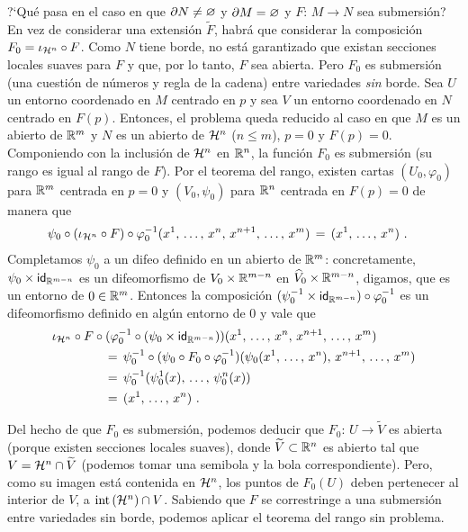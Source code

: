 \begin{obsInmersionConBorde}
	?`Qu\'{e} pasa en el caso en que $\borde[N]\not=\varnothing$ y
	$\borde[M]=\varnothing$ y $F:\,M\rightarrow N$ sea submersi\'{o}n?
	En vez de considerar una extensi\'{o}n $\widetilde{F}$, habr\'{a}
	que considerar la composici\'{o}n $F_{0}=\inc[{\hemi[n]}]\circ F$.
	Como $N$ tiene borde, no est\'{a} garantizado que existan secciones
	locales suaves para $F$ y que, por lo tanto, $F$ sea abierta. Pero
	$F_{0}$ es submersi\'{o}n (una cuesti\'{o}n de n\'{u}meros y regla
	de la cadena) entre variedades \emph{sin} borde. Sea $U$ un entorno
	coordenado en $M$ centrado en $p$ y sea $V$ un entorno coordenado
	en $N$ centrado en $F(p)$. Entonces, el problema queda reducido
	al caso en que $M$ es un abierto de $\bb{R}^{m}$ y $N$ es un
	abierto de $\hemi[n]$ ($n\leq m$), $p=0$ y $F(p)=0$. Componiendo
	con la inclusi\'{o}n de $\hemi[n]$ en $\bb{R}^{n}$, la funci\'{o}n
	$F_{0}$ es submersi\'{o}n (su rango es igual al rango de $F$).
	Por el teorema del rango, existen cartas $(U_{0},\varphi_{0})$ para
	$\bb{R}^{m}$ centrada en $p=0$ y $(V_{0},\psi_{0})$ para
	$\bb{R}^{n}$ centrada en $F(p)=0$ de manera que
	\begin{align*}
		\psi_{0}\circ (\inc[{\hemi[n]}]\circ F)\circ\varphi_{0}^{-1}
			(x^{1},\,\dots,\,x^{n},\,x^{n+1},\,\dots,\,x^{m}) &
			\,=\,(\lista*{x}{n})
		\text{ .}
	\end{align*}
	Completamos $\psi_{0}$ a un difeo definido en un abierto de
	$\bb{R}^{m}$: concretamente, $\psi_{0}\times\id[\bb{R}^{m-n}]$ es
	un difeomorfismo de $V_{0}\times\bb{R}^{m-n}$ en
	$\widehat{V}_{0}\times\bb{R}^{m-n}$, digamos, que es un entorno de
	$0\in\bb{R}^{m}$. Entonces la composici\'{o}n
	$(\psi_{0}^{-1}\times\id[\bb{R}^{m-n}])\circ\varphi_{0}^{-1}$ es un
	difeomorfismo definido en alg\'{u}n entorno de $0$ y vale que
	\begin{align*}
		& \inc[{\hemi[n]}]\circ F\circ
			(\varphi_{0}^{-1}\circ
				(\psi_{0}\times\id[\bb{R}^{m-n}]))
			(x^{1},\,\dots,\,x^{n},\,x^{n+1},\,\dots,\,x^{m}) \\
		&\qquad\qquad
			\,=\,\psi_{0}^{-1}\circ
				(\psi_{0}\circ F_{0}\circ\varphi_{0}^{-1})
				(\psi_{0}(x^{1},\,\dots,\,x^{n}),\,x^{n+1},\,
				\dots,\,x^{m}) \\
		& \qquad\qquad
			\,=\,\psi_{0}^{-1}(\psi_{0}^{1}(x),\,
				\dots,\,\psi_{0}^{n}(x)) \\
		& \qquad\qquad
			\,=\,(\lista*{x}{n})
		\text{ .}
	\end{align*}

	Del hecho de que $F_{0}$ es submersi\'{o}n, podemos deducir que
	$F_{0}:\,U\rightarrow \widetilde{V}$ es abierta (porque existen
	secciones locales suaves), donde $\widetilde{V}\subset\bb{R}^{n}$ es
	abierto tal que $V=\hemi[n]\cap\widetilde{V}$ (podemos tomar una
	semibola y la bola correspondiente). Pero, como su imagen est\'{a}
	contenida en $\hemi[n]$, los puntos de $F_{0}(U)$ deben pertenecer al
	interior de $V$, a $\interior{\hemi[n]}\cap V$. Sabiendo que
	$F$ se correstringe a una submersi\'{o}n entre variedades sin borde,
	podemos aplicar el teorema del rango sin problema.
\end{obsInmersionConBorde}
